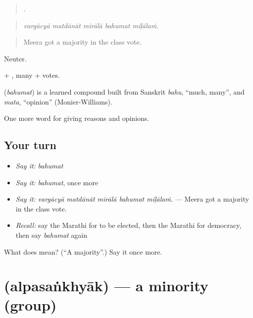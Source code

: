 \begin{quote}
    .
\end{quote}

\begin{quote}
\emph{vargācyā matdānāt mīrālā bahumat miḷālaṁ.}
\end{quote}

\begin{quote}
Meera got a majority in the class vote.
\end{quote}

Neuter.

 + , many + votes.

\begin{cousinweb}
\textbf{} (\emph{bahumat}) is a learned compound built from Sanskrit \emph{bahu}, \textquotedblleft{}much, many\textquotedblright{}, and \emph{mata}, \textquotedblleft{}opinion\textquotedblright{} (Monier-Williams).
\end{cousinweb}

\begin{grammarlens}[title={What you've built}]
One more word for giving reasons and opinions.
\end{grammarlens}

\subsection*{Your turn}
\begin{itemize}
\raggedright
  \item \emph{Say it:} \emph{bahumat}
  \item \emph{Say it:} \emph{bahumat}, once more
  \item \emph{Say it:} \emph{vargācyā matdānāt mīrālā bahumat miḷālaṁ.} — Meera got a majority in the class vote.
  \item \emph{Recall:} say the Marathi for to be elected, then the Marathi for democracy, then say \emph{bahumat} again
\end{itemize}

\begin{tcolorbox}[breakable,colback=teal!4,colframe=teal!35!black,title={Before you move on}]
What does  mean? (\textquotedblleft{}A majority\textquotedblright{}.) Say it once more.
\end{tcolorbox}
\section[\texorpdfstring{\mr{अल्पसंख्याक} (alpasaṅkhyāk)}{अल्पसंख्याक (alpasaṅkhyāk)}]{ (alpasaṅkhyāk) — a minority (group)}


